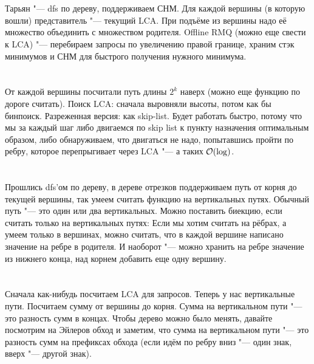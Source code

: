 \section{} %
Тарьян "--- dfs по дереву, поддерживаем СНМ.
Для каждой вершины (в которую вошли) представитель "--- текущий LCA.
При подъёме из вершины надо её множество объединить с множеством родителя.
Offline RMQ (можно еще свести к LCA) "--- перебираем запросы по увеличению правой границе,
храним стэк минимумов и СНМ для быстрого получения нужного минимума. 

\section{} %
От каждой вершины посчитали путь длины $2^k$ наверх (можно еще функцию по дороге считать).
Поиск LCA: сначала выровняли высоты, потом как бы бинпоиск.
Разреженная версия: как skip-list.
Будет работать быстро, потому что мы за каждый шаг либо двигаемся по skip list к пункту назначения оптимальным образом,
либо обнаруживаем, что двигаться не надо, попытавшись пройти по ребру, которое перепрыгивает через LCA "--- а таких $\mathcal{O}(\log)$.

\section{} %
Прошлись dfs'ом по дереву, в дереве отрезков поддерживаем путь от корня до текущей вершины,
так умеем считать функцию на вертикальных путях.
Обычный путь "--- это один или два вертикальных.
Можно поставить биекцию, если считать только на вертикальных путях:
Если мы хотим считать на рёбрах, а умеем только в вершинах, можно считать,
что в каждой вершине написано значение на ребре в родителя.
И наоборот "--- можно хранить на ребре значение из нижнего конца, над корнем добавить еще одну вершину.

\section{} %
Сначала как-нибудь посчитаем LCA для запросов.
Теперь у нас вертикальные пути.
Посчитаем сумму от вершины до корня.
Сумма на вертикальном пути "--- это разность сумм в концах.
Чтобы дерево можно было менять, давайте посмотрим на Эйлеров обход и
заметим, что сумма на вертикальном пути "--- это разность сумм на префиксах обхода
(если идём по ребру вниз "--- один знак, вверх "--- другой знак).

\section{} %
\TODO


